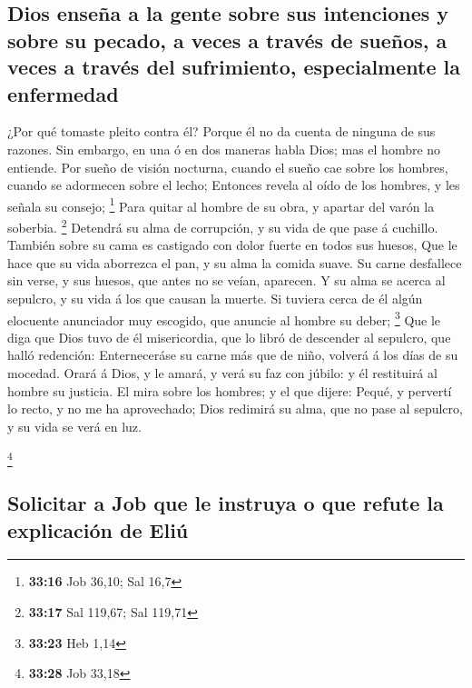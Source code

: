\hypertarget{dios-enseuxf1a-a-la-gente-sobre-sus-intenciones-y-sobre-su-pecado-a-veces-a-travuxe9s-de-sueuxf1os-a-veces-a-travuxe9s-del-sufrimiento-especialmente-la-enfermedad}{%
\subsection{Dios enseña a la gente sobre sus intenciones y sobre su
pecado, a veces a través de sueños, a veces a través del sufrimiento,
especialmente la
enfermedad}\label{dios-enseuxf1a-a-la-gente-sobre-sus-intenciones-y-sobre-su-pecado-a-veces-a-travuxe9s-de-sueuxf1os-a-veces-a-travuxe9s-del-sufrimiento-especialmente-la-enfermedad}}

 ¿Por qué tomaste pleito contra él? Porque él no da
cuenta de ninguna de sus razones.  Sin embargo, en una ó
en dos maneras habla Dios; mas el hombre no entiende. 
Por sueño de visión nocturna, cuando el sueño cae sobre los hombres,
cuando se adormecen sobre el lecho;  Entonces revela al
oído de los hombres, y les señala su consejo; \footnote{\textbf{33:16}
  Job 36,10; Sal 16,7}  Para quitar al hombre de su obra,
y apartar del varón la soberbia. \footnote{\textbf{33:17} Sal 119,67;
  Sal 119,71}  Detendrá su alma de corrupción, y su vida
de que pase á cuchillo.  También sobre su cama es
castigado con dolor fuerte en todos sus huesos,  Que le
hace que su vida aborrezca el pan, y su alma la comida suave.
 Su carne desfallece sin verse, y sus huesos, que antes
no se veían, aparecen.  Y su alma se acerca al sepulcro,
y su vida á los que causan la muerte.  Si tuviera cerca
de él algún elocuente anunciador muy escogido, que anuncie al hombre su
deber; \footnote{\textbf{33:23} Heb 1,14}  Que le diga
que Dios tuvo de él misericordia, que lo libró de descender al sepulcro,
que halló redención:  Enterneceráse su carne más que de
niño, volverá á los días de su mocedad.  Orará á Dios, y
le amará, y verá su faz con júbilo: y él restituirá al hombre su
justicia.  El mira sobre los hombres; y el que dijere:
Pequé, y pervertí lo recto, y no me ha aprovechado;  Dios
redimirá su alma, que no pase al sepulcro, y su vida se verá en luz.

\footnote{\textbf{33:28} Job 33,18}

\hypertarget{solicitar-a-job-que-le-instruya-o-que-refute-la-explicaciuxf3n-de-eliuxfa}{%
\subsection{Solicitar a Job que le instruya o que refute la explicación
de
Eliú}\label{solicitar-a-job-que-le-instruya-o-que-refute-la-explicaciuxf3n-de-eliuxfa}}

